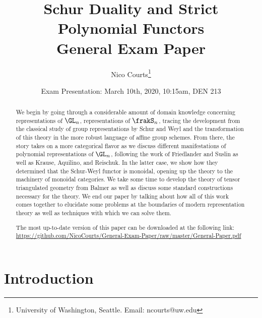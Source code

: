 \documentclass[12pt]{article}
\begin{document}
\title{Schur Duality and Strict Polynomial Functors\\\vspace{1ex} \normalsize General Exam Paper}
\author{Nico Courts\footnote{University of Washington, Seattle. Email: ncourts@uw.edu}}
\date{Exam Presentation: March 10th, 2020, 10:15am, DEN 213}
\maketitle

\begin{abstract}
	We begin by going through a considerable amount of domain knowledge concerning representations of $\GL_n$,
	representations of $\frakS_n$, tracing the development from the classical study of group representations by Schur
	and Weyl and the transformation of this theory in the more robust language of affine group schemes. From there,
	the story takes on a more categorical flavor as we discuss different manifestations of polynomial representations of $\GL_n$, 
	following the work of Friedlander and Suslin as well as Krause, Aquilino, and Reischuk. In the latter case, 
	we show how they determined that the Schur-Weyl functor is monoidal, opening up the theory to the machinery of 
	monoidal categories. We take some time to develop the theory of tensor triangulated geometry from Balmer as well 
	as discuss some standard constructions necessary for the theory. We end our paper by talking about how all of this work 
	comes together to elucidate some problems at the boundaries of modern representation theory as well as techniques with 
	which we can solve them.\vspace{0.5in}

	{\begin{center}
		\footnotesize The most up-to-date version of this paper can be downloaded at the following link:\\
		\url{https://github.com/NicoCourts/General-Exam-Paper/raw/master/General-Paper.pdf}
	\end{center}}
\end{abstract}

\newpage
\tableofcontents

\newpage
\section{Introduction}
\end{document}
